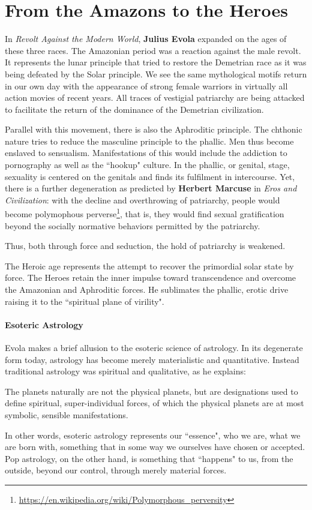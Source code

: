 \section{From the Amazons to the Heroes}

In \emph{Revolt Against the Modern World}, \textbf{Julius Evola} expanded on the ages of these three races. The Amazonian period was a reaction against the male revolt. It represents the lunar principle that tried to restore the Demetrian race as it was being defeated by the Solar principle. We see the same mythological motifs return in our own day with the appearance of strong female warriors in virtually all action movies of recent years. All traces of vestigial patriarchy are being attacked to facilitate the return of the dominance of the Demetrian civilization.

Parallel with this movement, there is also the Aphroditic principle. The chthonic nature tries to reduce the masculine principle to the phallic. Men thus become enslaved to sensualism. Manifestations of this would include the addiction to pornography as well as the ``hookup" culture. In the phallic, or genital, stage, sexuality is centered on the genitals and finds its fulfilment in intercourse. Yet, there is a further degeneration as predicted by \textbf{Herbert Marcuse} in \textit{Eros and Civilization}: with the decline and overthrowing of patriarchy, people would become polymophous perverse\footnote{\url{https://en.wikipedia.org/wiki/Polymorphous_perversity}}, that is, they would find sexual gratification beyond the socially normative behaviors permitted by the patriarchy.

Thus, both through force and seduction, the hold of patriarchy is weakened.

The Heroic age represents the attempt to recover the primordial solar state by force. The Heroes retain the inner impulse toward transcendence and overcome the Amazonian and Aphroditic forces. He sublimates the phallic, erotic drive raising it to the ``spiritual plane of virility".

\paragraph{Esoteric Astrology}
Evola makes a brief allusion to the esoteric science of astrology. In its degenerate form today, astrology has become merely materialistic and quantitative. Instead traditional astrology was spiritual and qualitative, as he explains:

\begin{quotex}
The planets naturally are not the physical planets, but are designations used to define spiritual, super-individual forces, of which the physical planets are at most symbolic, sensible manifestations. 

\end{quotex}
In other words, esoteric astrology represents our ``essence", who we are, what we are born with, something that in some way we ourselves have chosen or accepted. Pop astrology, on the other hand, is something that ``happens" to us, from the outside, beyond our control, through merely material forces.


